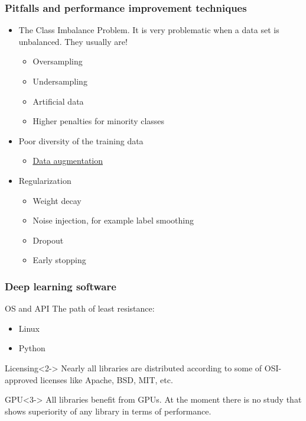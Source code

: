 \documentclass{beamer}
\begin{document}
\begin{frame}[label=pitfalls]
\frametitle{Pitfalls and performance improvement techniques}
\begin{itemize}
\item<1-> The Class Imbalance Problem. It is very problematic when a data set is unbalanced. They usually are!
\begin{itemize}
\item Oversampling
\item Undersampling
\item Artificial data

\item Higher penalties for minority classes
\end{itemize}
\item<2-> Poor diversity of the training data
\begin{itemize}
\item \hyperlink{data_augmentation}{\underline{Data augmentation}}
\end{itemize}

\item<3-> Regularization
\begin{itemize}
\item Weight decay
\item Noise injection, for example label smoothing
\item Dropout
\item Early stopping
\end{itemize}
\end{itemize}
\end{frame}


%
%

\begin{frame}
\frametitle{Deep learning software}

\begin{block}{OS and API}
The path of least resistance:
\begin{itemize}
\item Linux
\item Python
\end{itemize}
\end{block}

\begin{block}{Licensing}<2->
Nearly all libraries are distributed according to some of OSI-approved licenses like Apache, BSD, MIT, etc.
\end{block}

\begin{block}{GPU}<3->
All libraries benefit from GPUs. At the moment there is no study that shows superiority of any library in terms of performance.
\end{block}

\end{frame}
\end{document}
